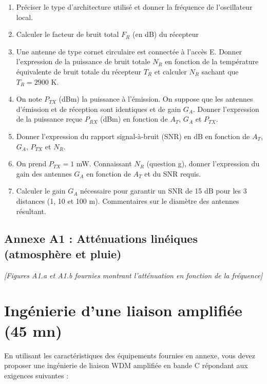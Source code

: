 \documentclass[a4paper,11pt]{article}
\begin{document}
\begin{enumerate}[label=\alph*., start=5]
    \item Préciser le type d'architecture utilisé et donner la fréquence de l'oscillateur local.
    
    \item Calculer le facteur de bruit total $F_R$ (en dB) du récepteur
    
    \item Une antenne de type cornet circulaire est connectée à l'accès E. Donner l'expression de la puissance de bruit totale $N_R$ en fonction de la température équivalente de bruit totale du récepteur $T_R$ et calculer $N_R$ sachant que $T_R = 2900$ K.
    
    \item On note $P_{TX}$ (dBm) la puissance à l'émission. On suppose que les antennes d'émission et de réception sont identiques et de gain $G_A$. Donner l'expression de la puissance reçue $P_{RX}$ (dBm) en fonction de $A_T$, $G_A$ et $P_{TX}$.
    
    \item Donner l'expression du rapport signal-à-bruit (SNR) en dB en fonction de $A_T$, $G_A$, $P_{TX}$ et $N_R$.
    
    \item On prend $P_{TX} = 1$ mW. Connaissant $N_R$ (question g), donner l'expression du gain des antennes $G_A$ en fonction de $A_T$ et du SNR requis.
    
    \item Calculer le gain $G_A$ nécessaire pour garantir un SNR de 15 dB pour les 3 distances (1, 10 et 100 m). Commentaires sur le diamètre des antennes résultant.
\end{enumerate}

\subsection*{Annexe A1 : Atténuations linéiques (atmosphère et pluie)}

\textit{[Figures A1.a et A1.b fournies montrant l'atténuation en fonction de la fréquence]}

\section{Ingénierie d'une liaison amplifiée (45 mn)}

En utilisant les caractéristiques des équipements fournies en annexe, vous devez proposer une ingénierie de liaison WDM amplifiée en bande C répondant aux exigences suivantes :
\end{document}
